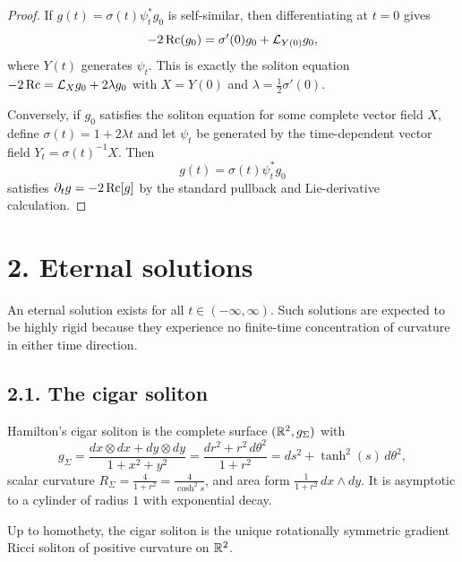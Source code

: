 \begin{proof}
If \(g(t)=\sigma(t)\psi_t^*g_0\) is self-similar, then differentiating at
\(t=0\) gives
\[
-2\operatorname{Rc}(g_0)=\sigma'(0)g_0+\mathcal L_{Y(0)}g_0,
\]
where \(Y(t)\) generates \(\psi_t\). This is exactly the soliton equation
\(-2\operatorname{Rc}=\mathcal L_X g_0+2\lambda g_0\) with \(X=Y(0)\) and
\(\lambda=\frac12\sigma'(0)\).

Conversely, if \(g_0\) satisfies the soliton equation for some complete vector
field \(X\), define \(\sigma(t)=1+2\lambda t\) and let \(\psi_t\) be generated by
the time-dependent vector field \(Y_t=\sigma(t)^{-1}X\). Then
\[
g(t)=\sigma(t)\psi_t^*g_0
\]
satisfies \(\partial_t g=-2\operatorname{Rc}[g]\) by the standard pullback and Lie-derivative
calculation.
\end{proof}

\section*{2. Eternal solutions}

An eternal solution exists for all \(t\in(-\infty,\infty)\). Such solutions are
expected to be highly rigid because they experience no finite-time
concentration of curvature in either time direction.

\subsection*{2.1. The cigar soliton}

\begin{example}
\label{ch02-ex-cigar-soliton}
Hamilton's cigar soliton is the complete surface \((\mathbb{R}^2,g_\Sigma)\) with
\[
g_\Sigma=\frac{dx\otimes dx+dy\otimes dy}{1+x^2+y^2}
=\frac{dr^2+r^2\,d\theta^2}{1+r^2}
=ds^2+\tanh^2(s)\,d\theta^2,
\]
scalar curvature \(R_\Sigma=\frac{4}{1+r^2}=\frac{4}{\cosh^2 s}\), and area form
\(\frac{1}{1+r^2}\,dx\wedge dy\). It is asymptotic to a cylinder of radius \(1\)
with exponential decay.
\end{example}

\begin{lemma}
\label{ch02-lem-cigars-unique}
Up to homothety, the cigar soliton is the unique rotationally symmetric
gradient Ricci soliton of positive curvature on \(\mathbb{R}^2\).
\end{lemma}

